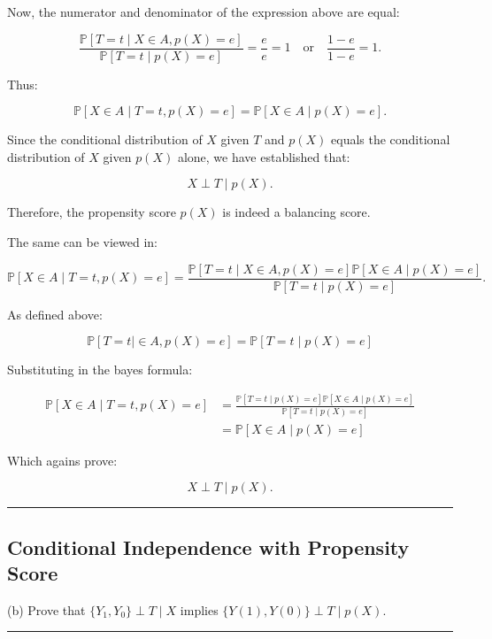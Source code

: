 \documentclass{article}
\newenvironment{colorparagraph}[1]{\par\color{#1}}{\par}
\begin{document}
Now, the numerator and denominator of the expression above are equal:

\[
\frac{\mathbb{P}[T = t \mid X \in A, p(X) = e]}{\mathbb{P}[T = t \mid p(X) = e]} = \frac{e}{e} = 1 \quad \text{or} \quad \frac{1 - e}{1 - e} = 1.
\]

Thus:

\[
\mathbb{P}[X \in A \mid T = t, p(X) = e] = \mathbb{P}[X \in A \mid p(X) = e].
\]

Since the conditional distribution of \( X \) given \( T \) and \( p(X) \) equals the conditional distribution of \( X \) given \( p(X) \) alone, we have established that:

\[
X \perp T \mid p(X).
\]

Therefore, the propensity score \( p(X) \) is indeed a balancing score.

The same can be viewed in:

\[
\mathbb{P}[X \in A \mid T = t, p(X) = e] = \frac{\mathbb{P}[T = t \mid X \in A, p(X) = e] \mathbb{P}[X \in A \mid p(X) = e]}{\mathbb{P}[T = t \mid p(X) = e]}.
\]

As defined above:

$$
\mathbb{P}[T = t \mid \in A, p(X) = e] = \mathbb{P}[T = t \mid p(X) = e]
$$

Substituting in the bayes formula:

\begin{align*}
    \mathbb{P}[X \in A \mid T = t, p(X) = e]
    &= \frac{\mathbb{P}[T = t \mid p(X) = e] \mathbb{P}[X \in A \mid p(X) = e]}{\mathbb{P}[T = t \mid p(X) = e]} \\
    &= \mathbb{P}[X \in A \mid p(X) = e]
\end{align*}

Which agains prove:

\[
X \perp T \mid p(X).
\]

\newpage

\begin{colorparagraph}{questioncolor}
\rule{\textwidth}{0.5pt}

\label{q2b}\subsection{Conditional Independence with Propensity Score}
(b) Prove that \( \{Y_1, Y_0\} \perp T \mid X \) implies \( \{Y(1), Y(0)\} \perp T \mid p(X) \).

\rule{\textwidth}{0.5pt}
\end{colorparagraph}
\end{document}
